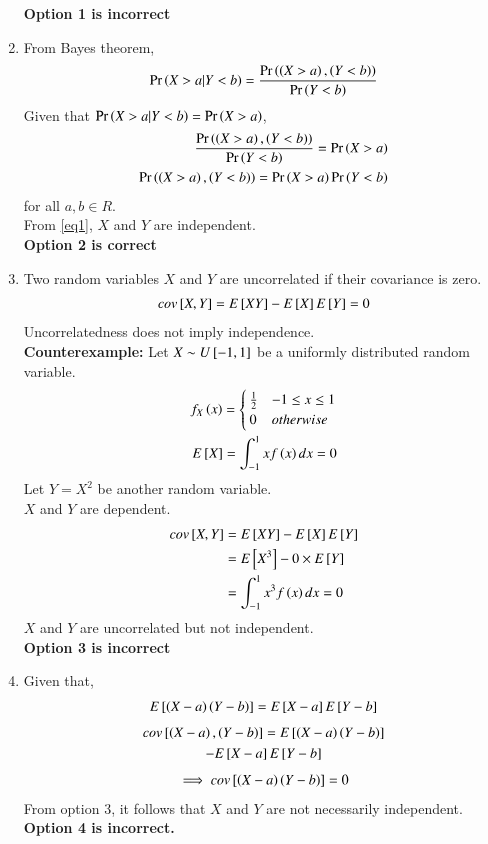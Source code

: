 \documentclass[journal,12pt,twocolumn]{IEEEtran}
\begin{document}
\begin{enumerate}
    \textbf{Option 1 is incorrect}
    
    \item From Bayes theorem,
\begin{align}
    \Pr\left(X>a|Y<b\right)=\frac{\Pr\left(\left(X>a\right),\left(Y<b\right)\right)}{\Pr\left(Y<b\right)}
\end{align}
Given that $\Pr\left(X>a|Y<b\right)=\Pr\left(X>a\right)$,
\begin{align}
    \frac{\Pr\left(\left(X>a\right),\left(Y<b\right)\right)}{\Pr\left(Y<b\right)}=\Pr\left(X>a\right)\\
    \Pr\left(\left(X>a\right),\left(Y<b\right)\right)=\Pr\left(X>a\right)\Pr\left(Y<b\right)
\end{align}
for all $a,b\in R$.\\
From \eqref{eq1}, $X$ and $Y$ are independent. \\
\textbf{Option 2 is correct}
    \item Two random variables $X$ and $Y$ are uncorrelated if their covariance is zero.
\begin{align}
    cov{}\left[X,Y\right]=E{}\left[XY\right]-E{}\left[X\right]E{}\left[Y\right]=0
\end{align}
    Uncorrelatedness does not imply independence.\\
    \textbf{Counterexample:} Let $X\sim U {}\left[-1,1\right]$ be a uniformly distributed random variable.
    \begin{align}
        f_X\left(x\right)=
        \begin{cases}
        \frac{1}{2} & -1\leq x \leq 1\\
        0 & otherwise
        \end{cases}\\
        E{}\left[X\right]=\int_{-1}^{1}x f\left(x\right) dx=0
    \end{align}
    Let $Y=X^2$ be another random variable.\\
    $X$ and $Y$ are dependent.
    \begin{align}
        cov{}\left[X,Y\right]&=E{}\left[XY\right]-E{}\left[X\right]E{}\left[Y\right]\\
        &=E{}\left[X^3\right]-0\times E{}\left[Y\right]\\
        &=\int_{-1}^{1}x^3 f\left(x\right) dx=0
    \end{align}
    $X$ and $Y$ are uncorrelated but not independent.\\
    \textbf{Option 3 is incorrect}
    \item Given that,
    \begin{align}
        E{}\left[\left(X-a\right)\left(Y-b\right)\right]=E{}\left[X-a\right]E{}\left[Y-b\right]
    \end{align}
    \begin{multline}
        cov{}\left[\left(X-a\right),\left(Y-b\right)\right]=
        E{}\left[\left(X-a\right)\left(Y-b\right)\right]\\-E{}\left[X-a\right]E{}\left[Y-b\right]
    \end{multline}
    \begin{align}
        \implies cov{}\left[\left(X-a\right)\left(Y-b\right)\right]=0
    \end{align}
    From option 3, it follows that $X$ and $Y$ are not necessarily independent.\\
    \textbf{Option 4 is incorrect.}
\end{enumerate}
\end{document}
